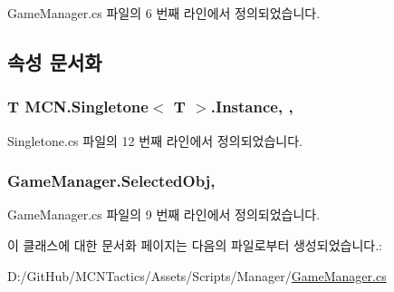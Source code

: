 Game\+Manager.\+cs 파일의 6 번째 라인에서 정의되었습니다.



\subsection{속성 문서화}
\subsubsection[{\texorpdfstring{Instance}{Instance}}]{\setlength{\rightskip}{0pt plus 5cm}T {\bf M\+C\+N.\+Singletone}$<$ T $>$.Instance\hspace{0.3cm}{\ttfamily [static]}, {\ttfamily [get]}, {\ttfamily [inherited]}}\hypertarget{class_m_c_n_1_1_singletone_a46dbbebd93e96a9592a9803c51f35602}{}\label{class_m_c_n_1_1_singletone_a46dbbebd93e96a9592a9803c51f35602}


Singletone.\+cs 파일의 12 번째 라인에서 정의되었습니다.

\subsubsection[{\texorpdfstring{Selected\+Obj}{SelectedObj}}]{ Game\+Manager.\+Selected\+Obj\hspace{0.3cm}{\ttfamily [get]}, {\ttfamily [set]}}\hypertarget{class_game_manager_afe043cc0216cce9ef00ddff0413e6edf}{}\label{class_game_manager_afe043cc0216cce9ef00ddff0413e6edf}


Game\+Manager.\+cs 파일의 9 번째 라인에서 정의되었습니다.



이 클래스에 대한 문서화 페이지는 다음의 파일로부터 생성되었습니다.\+:\begin{DoxyCompactItemize}
\item 
D\+:/\+Git\+Hub/\+M\+C\+N\+Tactics/\+Assets/\+Scripts/\+Manager/\hyperlink{_game_manager_8cs}{Game\+Manager.\+cs}\end{DoxyCompactItemize}
